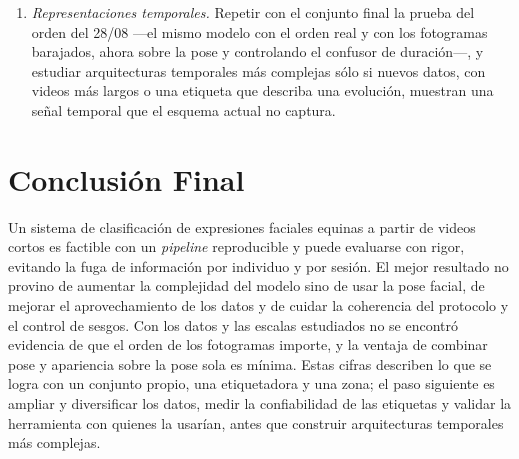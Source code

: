 \begin{enumerate}
  \item \textit{Representaciones temporales.} Repetir con el conjunto final la prueba del orden del 28/08 ---el mismo modelo con el orden real y con los fotogramas barajados, ahora sobre la pose y controlando el confusor de duración---, y estudiar arquitecturas temporales más complejas sólo si nuevos datos, con videos más largos o una etiqueta que describa una evolución, muestran una señal temporal que el esquema actual no captura.
\end{enumerate}

\section{Conclusión Final}
Un sistema de clasificación de expresiones faciales equinas a partir de videos cortos es factible con un \textit{pipeline} reproducible y puede evaluarse con rigor, evitando la fuga de información por individuo y por sesión. El mejor resultado no provino de aumentar la complejidad del modelo sino de usar la pose facial, de mejorar el aprovechamiento de los datos y de cuidar la coherencia del protocolo y el control de sesgos. Con los datos y las escalas estudiados no se encontró evidencia de que el orden de los fotogramas importe, y la ventaja de combinar pose y apariencia sobre la pose sola es mínima. Estas cifras describen lo que se logra con un conjunto propio, una etiquetadora y una zona; el paso siguiente es ampliar y diversificar los datos, medir la confiabilidad de las etiquetas y validar la herramienta con quienes la usarían, antes que construir arquitecturas temporales más complejas.
